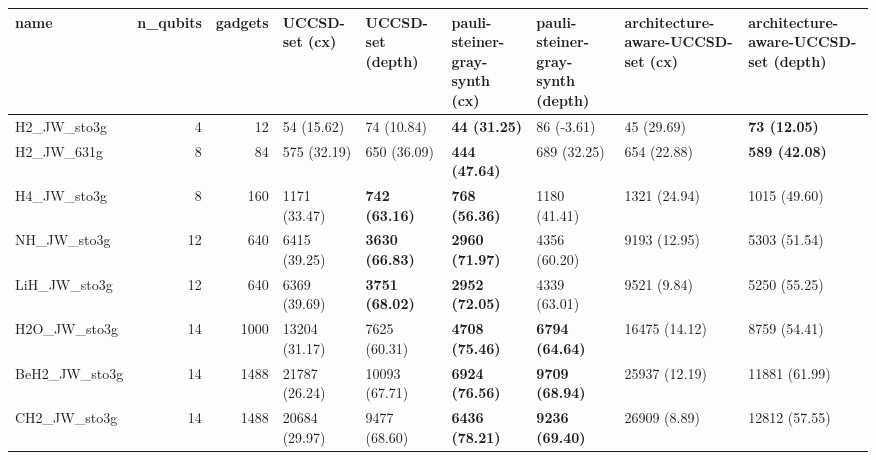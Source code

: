 \begin{tabular}{lrrllllll}
\toprule
name & n\_qubits & gadgets & UCCSD-set (cx) & UCCSD-set (depth) & pauli-steiner-gray-synth (cx) & pauli-steiner-gray-synth (depth) & architecture-aware-UCCSD-set (cx) & architecture-aware-UCCSD-set (depth) \\
\midrule
H2\_JW\_sto3g & 4 & 12 & 54 (15.62) & 74 (10.84) & \textbf{44 (31.25)} & 86 (-3.61) & 45 (29.69) & \textbf{73 (12.05)} \\
H2\_JW\_631g & 8 & 84 & 575 (32.19) & 650 (36.09) & \textbf{444 (47.64)} & 689 (32.25) & 654 (22.88) & \textbf{589 (42.08)} \\
H4\_JW\_sto3g & 8 & 160 & 1171 (33.47) & \textbf{742 (63.16)} & \textbf{768 (56.36)} & 1180 (41.41) & 1321 (24.94) & 1015 (49.60) \\
NH\_JW\_sto3g & 12 & 640 & 6415 (39.25) & \textbf{3630 (66.83)} & \textbf{2960 (71.97)} & 4356 (60.20) & 9193 (12.95) & 5303 (51.54) \\
LiH\_JW\_sto3g & 12 & 640 & 6369 (39.69) & \textbf{3751 (68.02)} & \textbf{2952 (72.05)} & 4339 (63.01) & 9521 (9.84) & 5250 (55.25) \\
H2O\_JW\_sto3g & 14 & 1000 & 13204 (31.17) & 7625 (60.31) & \textbf{4708 (75.46)} & \textbf{6794 (64.64)} & 16475 (14.12) & 8759 (54.41) \\
BeH2\_JW\_sto3g & 14 & 1488 & 21787 (26.24) & 10093 (67.71) & \textbf{6924 (76.56)} & \textbf{9709 (68.94)} & 25937 (12.19) & 11881 (61.99) \\
CH2\_JW\_sto3g & 14 & 1488 & 20684 (29.97) & 9477 (68.60) & \textbf{6436 (78.21)} & \textbf{9236 (69.40)} & 26909 (8.89) & 12812 (57.55) \\
\bottomrule
\end{tabular}
